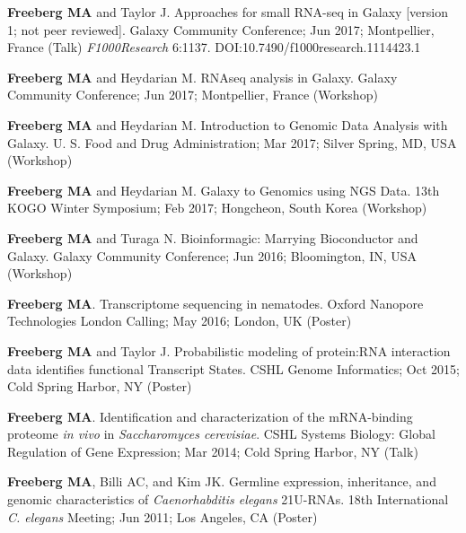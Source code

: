\documentclass[margin,line]{res}
\begin{document}
\begin{resume}
{\bf Freeberg MA} and Taylor J. Approaches for small RNA-seq in Galaxy [version 1; not peer reviewed]. Galaxy Community Conference; Jun 2017; Montpellier, France (Talk)
{\em F1000Research} 6:1137. DOI:10.7490/f1000research.1114423.1


{\bf Freeberg MA} and Heydarian M. RNAseq analysis in Galaxy. Galaxy Community Conference; Jun 2017; Montpellier, France (Workshop)

{\bf Freeberg MA} and Heydarian M. Introduction to Genomic Data Analysis with Galaxy. U. S. Food and Drug Administration; Mar 2017; Silver Spring, MD, USA (Workshop)


{\bf Freeberg MA} and Heydarian M. Galaxy to Genomics using NGS Data. 13th KOGO Winter Symposium; Feb 2017; Hongcheon, South Korea (Workshop)


{\bf Freeberg MA} and Turaga N. Bioinformagic: Marrying Bioconductor and Galaxy. Galaxy Community Conference; Jun 2016; Bloomington, IN, USA (Workshop)

{\bf Freeberg MA}. Transcriptome sequencing in nematodes. Oxford Nanopore Technologies London Calling; May 2016; London, UK (Poster)

{\bf Freeberg MA} and Taylor J. Probabilistic modeling of protein:RNA interaction data identifies functional Transcript States. CSHL Genome Informatics; Oct 2015; Cold Spring Harbor, NY (Poster)

{\bf Freeberg MA}. Identification and characterization of the mRNA-binding proteome {\em in vivo} in {\em Saccharomyces cerevisiae}. CSHL Systems Biology: Global Regulation of Gene Expression; Mar 2014; Cold Spring Harbor, NY (Talk)

{\bf Freeberg MA}, Billi AC, and Kim JK. Germline expression, inheritance, and genomic characteristics of {\em Caenorhabditis elegans} 21U-RNAs. 18th International {\em C. elegans} Meeting; Jun 2011; Los Angeles, CA (Poster)



\end{resume}
\end{document}
